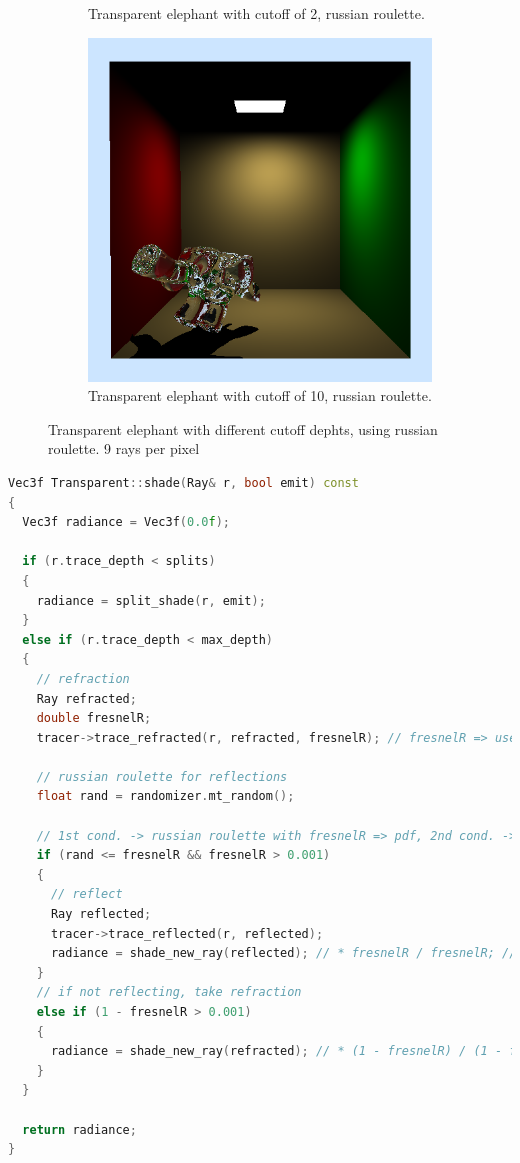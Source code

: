 \begin{figure}[h]
\begin{subfigure}[b]{0.3\textwidth}
		\caption{Transparent elephant with cutoff of 2, russian roulette.}
	\end{subfigure}
	\begin{subfigure}[b]{0.3\textwidth}
		\includegraphics[width=\textwidth]{week3/elephant_10_russ.png}
		\caption{Transparent elephant with cutoff of 10, russian roulette.}
	\end{subfigure}
	
	\caption{Transparent elephant with different cutoff dephts, using russian roulette. 9 rays per pixel}
	\label{fig:transparentelephantsruss}
\end{figure}

\newpage
\begin{lstlisting}[language=C++,caption=Transparent::shade,label=lst:transparent::shade]
Vec3f Transparent::shade(Ray& r, bool emit) const
{  
  Vec3f radiance = Vec3f(0.0f);

  if (r.trace_depth < splits)
  {
    radiance = split_shade(r, emit);
  }
  else if (r.trace_depth < max_depth)
  {
    // refraction
    Ray refracted;
    double fresnelR;
    tracer->trace_refracted(r, refracted, fresnelR); // fresnelR => use as step probability

    // russian roulette for reflections
    float rand = randomizer.mt_random();

    // 1st cond. -> russian roulette with fresnelR => pdf, 2nd cond. -> eliminating rays following surface
    if (rand <= fresnelR && fresnelR > 0.001)
    {
      // reflect
      Ray reflected;
      tracer->trace_reflected(r, reflected);
      radiance = shade_new_ray(reflected); // * fresnelR / fresnelR; // divide by fresnelR, since fresnelR is used as the step probability
    }
    // if not reflecting, take refraction
    else if (1 - fresnelR > 0.001)
    {
      radiance = shade_new_ray(refracted); // * (1 - fresnelR) / (1 - fresnelR);
    }
  }

  return radiance;
}
\end{lstlisting}

